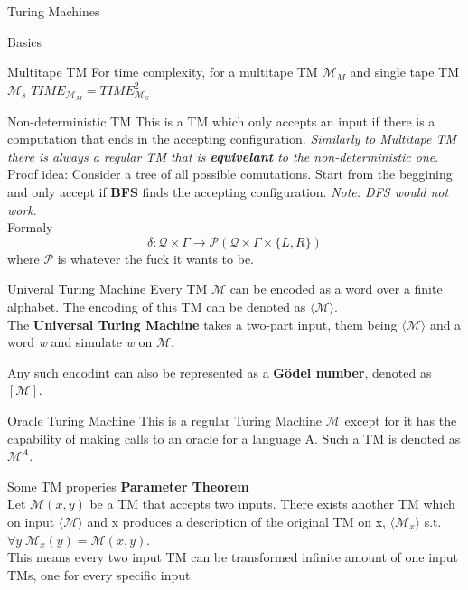 \documentclass[12pt, letterpaper]{article}
\begin{document}
\begin{section}{Turing Machines}
\begin{subsection}{Basics}
\begin{subsubsection}{Multitape TM}
      For time complexity, for a multitape TM \(\mathscr{M}_{M}\) and single tape
      TM \(\mathscr{M}_{s}\) \linebreak \(TIME_{\mathscr{M}_{M}} = TIME_{\mathscr{M}_{S}}^{2}\)
    \end{subsubsection}

    \begin{subsubsection}{Non-deterministic TM}
      This is a TM which only accepts an input if there is a computation
      that ends in the accepting configuration. \emph{Similarly to Multitape TM
        there is always a regular TM that is \textbf{equivelant}
        to the non-deterministic one}. Proof idea: Consider a tree
      of all possible comutations. Start from the beggining and only accept if
      \textbf{BFS} finds the accepting configuration. \textit{Note: DFS would not work}. \\
      Formaly
      \[\delta: \mathcal{Q} \times \Gamma \to \mathscr{P}(\mathcal{Q} \times \Gamma \times \{{} L, R \}{})\]
      where \(\mathscr{P}\) is whatever the fuck it wants to be.
    \end{subsubsection}

    \begin{subsubsection}{Univeral Turing Machine}
      Every TM \(\mathscr{M}\) can be encoded as a word over a finite alphabet.
      The encoding of this TM can be denoted as \(\langle \mathscr{M} \rangle\). \\
      The \textbf{Universal Turing Machine} takes a two-part input, them being
      \(\langle \mathscr{M} \rangle\) and a word \textit{w} and simulate
      \textit{w} on \(\mathscr{M}\).

      Any such encodint can also be represented as a \textbf{Gödel number},
      denoted as \([\mathscr{M}]\).
    \end{subsubsection}

    \begin{subsubsection}{Oracle Turing Machine}
      This is a regular Turing Machine \(\mathscr{M}\) except for it has the
      capability of making calls to an oracle for a language A. Such a TM is
      denoted as \(\mathscr{M}^{A}\).
    \end{subsubsection}

    \begin{subsubsection}{Some TM properies}
      \textbf{Parameter Theorem} \\
      Let \(\mathscr{M}(x, y)\) be a TM that accepts two inputs. There exists
      another TM which on input \(\langle \mathscr{M} \rangle\) and x produces
      a description of the original TM on x, \(\langle \mathscr{M}_{x} \rangle\)
      s.t.\ \(\forall y \; \mathscr{M}_{x}(y) = \mathscr{M}(x, y)\). \\
      This means every two input TM can be transformed infinite amount of one
      input TMs, one for every specific input.


\end{subsubsection}
\end{subsection}
\end{section}
\end{document}
